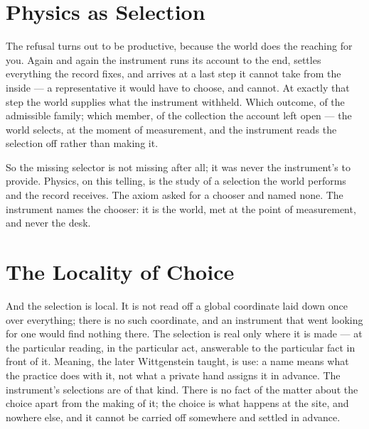 \section*{Physics as Selection}

The refusal turns out to be productive, because the world does the reaching for you. Again and again the
instrument runs its account to the end, settles everything the record fixes, and arrives at a last step it cannot
take from the inside --- a representative it would have to choose, and cannot. At exactly that step the world
supplies what the instrument withheld. Which outcome, of the admissible family; which member, of the collection
the account left open --- the world selects, at the moment of measurement, and the instrument reads the selection
off rather than making it.

So the missing selector is not missing after all; it was never the instrument's to provide. Physics, on this
telling, is the study of a selection the world performs and the record receives. The axiom asked for a chooser
and named none. The instrument names the chooser: it is the world, met at the point of measurement, and never
the desk.

\section*{The Locality of Choice}

And the selection is local. It is not read off a global coordinate laid down once over everything; there is no
such coordinate, and an instrument that went looking for one would find nothing there. The selection is real only
where it is made --- at the particular reading, in the particular act, answerable to the particular fact in front
of it. Meaning, the later Wittgenstein taught, is use: a name means what the practice does with it, not what a
private hand assigns it in advance. The instrument's selections are of that kind. There is no fact of the matter
about the choice apart from the making of it; the choice is what happens at the site, and nowhere else, and it
cannot be carried off somewhere and settled in advance.

